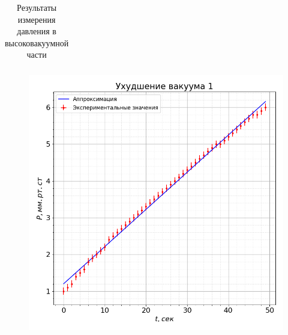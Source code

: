 \documentclass[a4paper, 12pt]{article}
\begin{document}
\begin{table}[!ht]
{\begin{tabular}{|c|c||c|c||c|c||c|c|}
                \end{tabular}}
                \caption{Результаты измерения давления в высоковакуумной части}
                \label{measures}
            \end{table}

            \begin{figure}[ht]
                \centering
                \begin{minipage}{0.45\textwidth}
                    \centering
                    \includegraphics[width=1\linewidth]{graphs/rise1.png}
                    \label{rise1}
                \end{minipage}
                \begin{minipage}{0.45\textwidth}
                    \centering

\end{minipage}
\end{figure}
\end{document}
